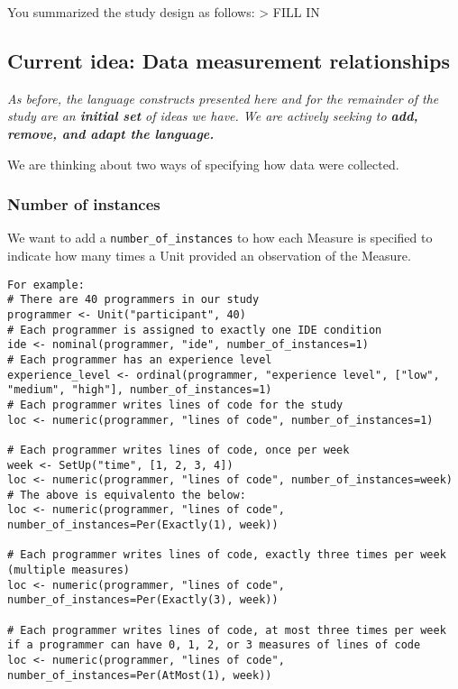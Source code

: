 You summarized the study design as follows: \textgreater{} FILL IN

\hypertarget{current-idea-data-measurement-relationships}{%
\subsection*{Current idea: Data measurement
relationships}\label{current-idea-data-measurement-relationships}}

\emph{As before, the language constructs presented here and for the
remainder of the study are an \textbf{initial set} of ideas we have. We
are actively seeking to \textbf{add, remove, and adapt the language.}}

We are thinking about two ways of specifying how data were collected.

\hypertarget{number-of-instances}{%
\subsubsection{Number of instances}\label{number-of-instances}}

We want to add a \texttt{number\_of\_instances} to how each Measure is
specified to indicate how many times a Unit provided an observation of
the Measure.

\begin{verbatim}
For example:
# There are 40 programmers in our study
programmer <- Unit("participant", 40)
# Each programmer is assigned to exactly one IDE condition
ide <- nominal(programmer, "ide", number_of_instances=1)
# Each programmer has an experience level
experience_level <- ordinal(programmer, "experience level", ["low", "medium", "high"], number_of_instances=1)
# Each programmer writes lines of code for the study
loc <- numeric(programmer, "lines of code", number_of_instances=1)

# Each programmer writes lines of code, once per week
week <- SetUp("time", [1, 2, 3, 4])
loc <- numeric(programmer, "lines of code", number_of_instances=week)
# The above is equivalento the below: 
loc <- numeric(programmer, "lines of code", number_of_instances=Per(Exactly(1), week))

# Each programmer writes lines of code, exactly three times per week (multiple measures)
loc <- numeric(programmer, "lines of code", number_of_instances=Per(Exactly(3), week))

# Each programmer writes lines of code, at most three times per week if a programmer can have 0, 1, 2, or 3 measures of lines of code 
loc <- numeric(programmer, "lines of code", number_of_instances=Per(AtMost(1), week))
\end{verbatim}

